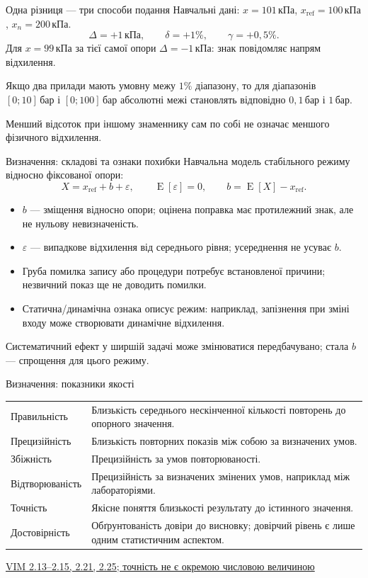 \documentclass[aspectratio=169,11pt]{beamer}
\newcommand{\unit}[1]{\,\text{#1}}
\newcommand{\src}[2]{\par\vfill{\tiny\href{#1}{#2}}}
\newcommand{\E}{\operatorname{E}}
\newcommand{\xref}{x_{\mathrm{ref}}}
\begin{document}
\begin{frame}{Одна різниця — три способи подання}
Навчальні дані: $x=101\unit{кПа}$, $\xref=100\unit{кПа}$, $x_n=200\unit{кПа}$.
\[
\Delta=+1\unit{кПа},\qquad \delta=+1\%,\qquad \gamma=+0{,}5\%.
\]
\medskip
Для $x=99\unit{кПа}$ за тієї самої опори $\Delta=-1\unit{кПа}$: знак повідомляє напрям відхилення.
\medskip

Якщо два прилади мають умовну межу $1\%$ діапазону, то для діапазонів $[0;10]\unit{бар}$ і $[0;100]\unit{бар}$ абсолютні межі становлять відповідно $0{,}1\unit{бар}$ і $1\unit{бар}$.
\medskip

Менший відсоток при іншому знаменнику сам по собі не означає меншого фізичного відхилення.
\end{frame}

\begin{frame}{Визначення: складові та ознаки похибки}
Навчальна модель стабільного режиму відносно фіксованої опори:
\[
X=\xref+b+\varepsilon,\qquad \E[\varepsilon]=0,
\qquad b=\E[X]-\xref.
\]
\begin{itemize}
\item $b$ — зміщення відносно опори; оцінена поправка має протилежний знак, але не нульову невизначеність.
\item $\varepsilon$ — випадкове відхилення від середнього рівня; усереднення не усуває $b$.
\item Груба помилка запису або процедури потребує встановленої причини; незвичний показ ще не доводить помилки.
\item Статична/динамічна ознака описує режим: наприклад, запізнення при зміні входу може створювати динамічне відхилення.
\end{itemize}
Систематичний ефект у ширшій задачі може змінюватися передбачувано; стала $b$ — спрощення для цього режиму.
\end{frame}

\begin{frame}{Визначення: показники якості}
\small
\begin{tabular}{>{\raggedright\arraybackslash}p{}>{\raggedright\arraybackslash}p{}}
\toprule
Правильність & Близькість середнього нескінченної кількості повторень до опорного значення.\\[1mm]
Прецизійність & Близькість повторних показів між собою за визначених умов.\\[1mm]
Збіжність & Прецизійність за умов повторюваності.\\[1mm]
Відтворюваність & Прецизійність за визначених змінених умов, наприклад між лабораторіями.\\[1mm]
Точність & Якісне поняття близькості результату до істинного значення.\\[1mm]
Достовірність & Обґрунтованість довіри до висновку; довірчий рівень є лише одним статистичним аспектом.\\
\bottomrule
\end{tabular}
\src{https://jcgm.bipm.org/vim/en/2.13.html}{VIM 2.13–2.15, 2.21, 2.25; точність не є окремою числовою величиною}
\end{frame}
\end{document}
